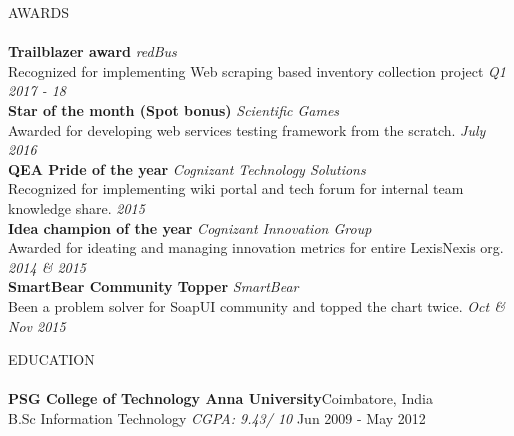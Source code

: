 \documentclass[a4paper]{article}
\newcommand{\lineunder} {
    \vspace*{-8pt} \\
    \hspace*{-18pt} \hrulefill \\
}
\newcommand{\header} [1] {
    {\hspace*{-18pt}\vspace*{6pt} \textsc{#1}}
    \vspace*{-6pt} \lineunder
}
\begin{document}
\header{AWARDS}
\textbf{Trailblazer award} \hfill \textit{redBus}\\
Recognized for implementing Web scraping based inventory collection project \hfill \textit{Q1 2017 - 18}\\
\vspace*{0.5mm}
\textbf{Star of the month (Spot bonus)} \hfill \textit{Scientific Games}\\
Awarded for developing web services testing framework from the scratch. \hfill \textit{July 2016}\\
\vspace*{0.5mm}
\textbf{QEA Pride of the year} \hfill \textit{Cognizant Technology Solutions}\\
Recognized for implementing wiki portal and tech forum for internal team knowledge share. \hfill \textit{2015}\\
\vspace*{0.5mm}
\textbf{Idea champion of the year} \hfill \textit{Cognizant Innovation Group}\\
Awarded for ideating and managing innovation metrics for entire LexisNexis org. \hfill \textit{2014 \& 2015}\\
\vspace*{0.5mm}
\textbf{SmartBear Community Topper} \hfill \textit{SmartBear}\\
Been a problem solver for SoapUI community and topped the chart twice. \hfill \textit{Oct \& Nov 2015}\\
\vspace*{0.5mm}

\header{EDUCATION}
\textbf{PSG College of Technology \textbar{} Anna University}\hfill Coimbatore, India\\
B.Sc Information Technology \textit{CGPA: 9.43/ 10} \hfill Jun 2009 - May 2012\\
\vspace*{-12pt}
\end{document}

